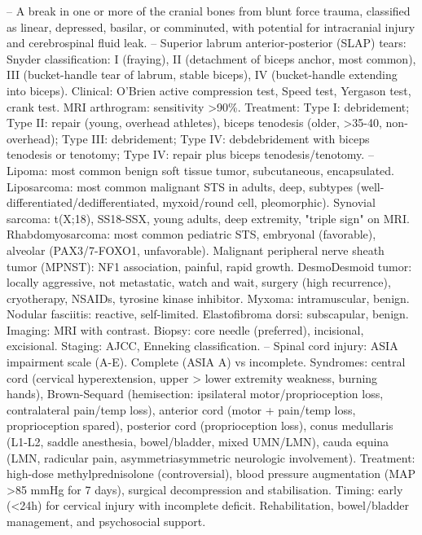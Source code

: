 -- A break in one or more of the cranial bones from blunt force trauma, classified as linear, depressed, basilar, or comminuted, with potential for intracranial injury and cerebrospinal fluid leak.
-- Superior labrum anterior-posterior (SLAP) tears: Snyder classification: I (fraying), II (detachment of biceps anchor, most common), III (bucket-handle tear of labrum, stable biceps), IV (bucket-handle extending into biceps). Clinical: O'Brien active compression test, Speed test, Yergason test, crank test. MRI arthrogram: sensitivity >90\%. Treatment: Type I: debridement; Type II: repair (young, overhead athletes), biceps tenodesis (older, >35-40, non-overhead); Type III: debridement; Type IV: debdebridement with biceps tenodesis or tenotomy; Type IV: repair plus biceps tenodesis/tenotomy.
-- Lipoma: most common benign soft tissue tumor, subcutaneous, encapsulated. Liposarcoma: most common malignant STS in adults, deep, subtypes (well-differentiated/dedifferentiated, myxoid/round cell, pleomorphic). Synovial sarcoma: t(X;18), SS18-SSX, young adults, deep extremity, "triple sign" on MRI. Rhabdomyosarcoma: most common pediatric STS, embryonal (favorable), alveolar (PAX3/7-FOXO1, unfavorable). Malignant peripheral nerve sheath tumor (MPNST): NF1 association, painful, rapid growth. DesmoDesmoid tumor: locally aggressive, not metastatic, watch and wait, surgery (high recurrence), cryotherapy, NSAIDs, tyrosine kinase inhibitor. Myxoma: intramuscular, benign. Nodular fasciitis: reactive, self-limited. Elastofibroma dorsi: subscapular, benign. Imaging: MRI with contrast. Biopsy: core needle (preferred), incisional, excisional. Staging: AJCC, Enneking classification.
-- Spinal cord injury: ASIA impairment scale (A-E). Complete (ASIA A) vs incomplete. Syndromes: central cord (cervical hyperextension, upper > lower extremity weakness, burning hands), Brown-Sequard (hemisection: ipsilateral motor/proprioception loss, contralateral pain/temp loss), anterior cord (motor + pain/temp loss, proprioception spared), posterior cord (proprioception loss), conus medullaris (L1-L2, saddle anesthesia, bowel/bladder, mixed UMN/LMN), cauda equina (LMN, radicular pain, asymmetriasymmetric neurologic involvement). Treatment: high-dose methylprednisolone (controversial), blood pressure augmentation (MAP >85 mmHg for 7 days), surgical decompression and stabilisation. Timing: early (<24h) for cervical injury with incomplete deficit. Rehabilitation, bowel/bladder management, and psychosocial support.
